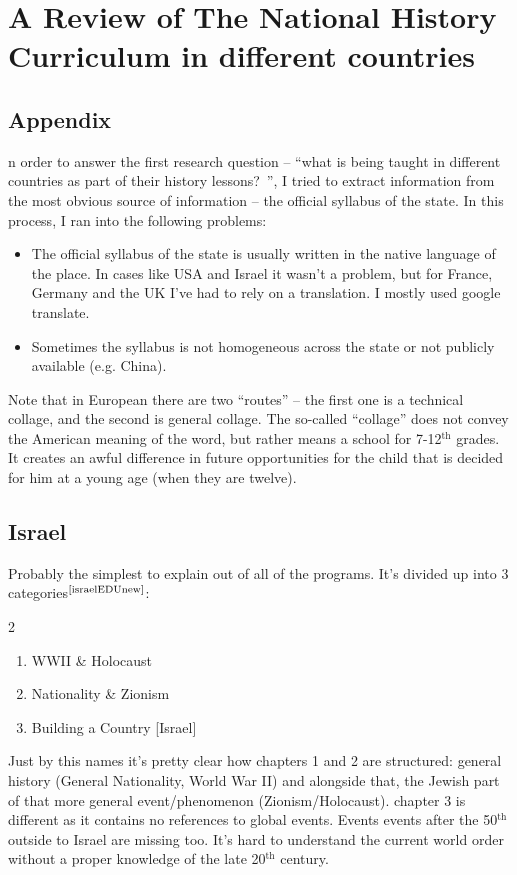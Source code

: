 \documentclass[12pt]{../../../tex/classes/styledArticle}
\newcommand\mc[1]  {$^{\text{\cite{#1}}}$}
\begin{document}
	\section{A Review of The National History Curriculum in different countries}
	\subsection{Appendix}
	n order to answer the first research question -- ``what is being taught in different countries as part of their history lessons?\ \!'', I tried to extract information from the most obvious source of information -- the official syllabus of the state. In this process, I ran into the following problems: 
	\begin{itemize}
		\item The official syllabus of the state is usually written in the native language of the place. In cases like USA and Israel it wasn't a problem, but for France, Germany and the UK I've had to rely on a translation. I mostly used google translate. 
		\item Sometimes the syllabus is not homogeneous across the state or not publicly available (e.g. China). 
	\end{itemize}
	
	Note that in European there are two ``routes'' -- the first one is a technical collage, and the second is general collage. The so-called ``collage'' does not convey the American meaning of the word, but rather means a school for 7-12$^{\text{th}}$ grades. It creates an awful difference in future opportunities for the child that is decided for him at a young age (when they are twelve). 
	
	\subsection{Israel}
	Probably the simplest to explain out of all of the programs. It's divided up into 3 categories\mc{israelEDUnew}: 
	\begin{multicols}{2}
		\begin{enumerate}
			\item WWII \& Holocaust
			\item Nationality \& Zionism
			\item Building a Country [Israel]
		\end{enumerate}
	\end{multicols}
	Just by this names it's pretty clear how chapters 1 and 2 are structured: general history (General Nationality, World War II) and alongside that, the Jewish part of that more general event/phenomenon (Zionism/Holocaust). chapter 3 is different as it contains no references to global events. Events events after the 50$^{\text{th}}$ outside to Israel are missing too. It's hard to understand the current world order without a proper knowledge of the late 20$^{\text{th}}$ century. 
	
\end{document}
